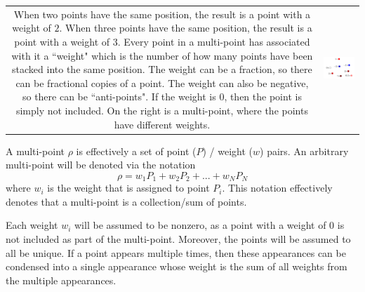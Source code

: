 \documentclass{book}
\begin{document}
\vspace{5mm}

\begin{tabular}{cc}
\parbox{0.5\textwidth}{
When two points have the same position, the result is a point with a weight of \(2\). When three points have the same position, the result is a point with a weight of \(3\). Every point in a multi-point has associated with it a ``weight" which is the number of how many points have been stacked into the same position. The weight can be a fraction, so there can be fractional copies of a point. The weight can also be negative, so there can be ``anti-points". If the weight is \(0\), then the point is simply not included. On the right is a multi-point, where the points have different weights.
} & \parbox{0.5\textwidth}{
\includegraphics[scale = 0.75]{Multi-structures/Multipoints/multi-point_multiplicity}
}
\end{tabular}

\vspace{2mm}

A multi-point \(\rho\) is effectively a set of point (\(P\)) / weight (\(w\)) pairs. An arbitrary multi-point will be denoted via the notation
\[\rho = w_1 P_1 + w_2 P_2 + ... + w_N P_N\]
where \(w_i\) is the weight that is assigned to point \(P_i\). This notation effectively denotes that a multi-point is a collection/sum of points.

Each weight \(w_i\) will be assumed to be nonzero, as a point with a weight of 0 is not included as part of the multi-point. Moreover, the points will be assumed to all be unique. If a point appears multiple times, then these appearances can be condensed into a single appearance whose weight is the sum of all weights from the multiple appearances. 
\end{document}
